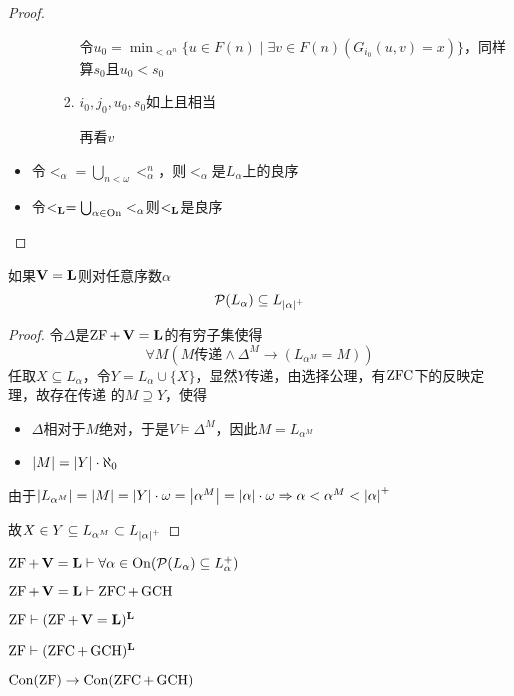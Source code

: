 \documentclass[11pt]{article}
\begin{document}
\begin{proof}
\begin{itemize}
\begin{enumerate}
\begin{enumerate}
令\(u_0=\min_{<\alpha^n}\{u\in F(n)\mid\exists v\in F(n)(G_{i_0}(u,v)=x)\}\)，同样算\(s_0\)且\(u_0<s_0\)
\item \(i_0,j_0,u_0,s_0\)如上且相当

再看\(v\)
\end{enumerate}
\end{enumerate}
\item 令\(<_\alpha=\bigcup_{n<\omega}<_\alpha^n\)，则\(<_\alpha\)是\(L_\alpha\)上的良序
\item 令\(<_{\operatorname{\textbf{L}}}=\bigcup_{\alpha\in\operatorname{On}}<_\alpha\)则\(<_{\operatorname{\textbf{L}}}\)是良序
\end{itemize}
\end{proof}

\begin{theorem}[ZF]
如果\(\operatorname{\textbf{V}}=\operatorname{\textbf{L}}\)则对任意序数\(\alpha\)
\begin{equation*}
\calp(L_\alpha)\subseteq L_{\abs{\alpha}^+}
\end{equation*}
\end{theorem}

\begin{proof}
令\(\Delta\)是\(\operatorname{ZF}+\operatorname{\textbf{V}}=\operatorname{\textbf{L}}\)的有穷子集使得
\begin{equation*}
\forall M(M\text{传递}\wedge\Delta^M\to(L_{\alpha^M}=M))
\end{equation*}
任取\(X\subseteq L_\alpha\)，令\(Y=L_\alpha\cup\{X\}\)，显然\(Y\)传递，由选择公理，有\(\operatorname{ZFC}\)下的反映定理，故存在传递
的\(M\supseteq Y\)，使得
\begin{itemize}
\item \(\Delta\)相对于\(M\)绝对，于是\(V\vDash\Delta^M\)，因此\(M=L_{\alpha^M}\)
\item \(\abs{M}=\abs{Y}\cdot\aleph_0\)
\end{itemize}


由于\(\abs{L_{\alpha^M}}=\abs{M}=\abs{Y}\cdot\omega=\abs{\alpha^M}=\abs{\alpha}\cdot\omega\Rightarrow\alpha<\alpha^M<\abs{\alpha}^+\)



故\(X\in Y\subseteq L_{\alpha^M}\subset L_{\abs{\alpha}^+}\)
\end{proof}
\(\operatorname{ZF}+\operatorname{\textbf{V}}=\operatorname{\textbf{L}}\vdash\forall\alpha\in\operatorname{On}(\mathcal{P}(L_\alpha)\subseteq L_{\alpha}^+)\)

\(\operatorname{ZF}+\operatorname{\textbf{V}}=\operatorname{\textbf{L}}\vdash\operatorname{ZFC}+\operatorname{GCH}\)

\(\operatorname{ZF}\vdash(\operatorname{ZF}+\operatorname{\textbf{V}}=\operatorname{\textbf{L}})^{\operatorname{\textbf{L}}}\)

\(\operatorname{ZF}\vdash(\operatorname{ZFC}+\operatorname{GCH})^{\operatorname{\textbf{L}}}\)

\begin{corollary}[]
\(\text{Con}(\operatorname{ZF})\to\text{Con}(\operatorname{ZFC}+\operatorname{GCH})\)
\end{corollary}
\end{document}
